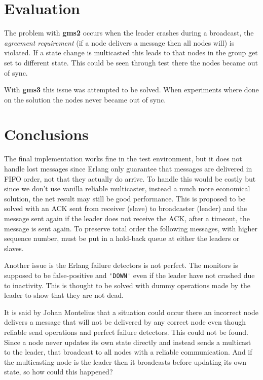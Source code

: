 \documentclass[a4paper, 11pt]{article}
\begin{document}
\section{Evaluation}

The problem with \textbf{gms2} occurs when the leader crashes during a broadcast, the \textit{agreement requirement} (if a node delivers a message then all nodes will) is violated. If a state change is multicasted this leads to that nodes in the group get set to different state. This could be seen through test there the nodes became out of sync.

With \textbf{gms3} this issue was attempted to be solved. When experiments where done on the solution the nodes never became out of sync.

\section{Conclusions}

The final implementation works fine in the test environment, but it does not handle lost messages since Erlang only guarantee that messages are delivered in FIFO order, not that they actually do arrive. To handle this would be costly but since we don't use vanilla reliable multicaster, instead a much more economical solution, the net result may still be good performance. This is proposed to be solved with an ACK sent from receiver (slave) to broadcaster (leader) and the message sent again if the leader does not receive the ACK, after a timeout, the message is sent again. To preserve total order the following messages, with higher sequence number, must be put in a hold-back queue at either the leaders or slaves.

Another issue is the Erlang failure detectors is not perfect. The monitors is supposed to be false-positive and \verb!'DOWN'! even if the leader have not crashed due to inactivity. This is thought to be solved with dummy operations made by the leader to show that they are not dead.

It is said by Johan Montelius that a situation could occur there an incorrect node delivers a message that will not be delivered by any correct node even though reliable send operations and perfect failure detectors. This could not be found. Since a node never updates its own state directly and instead sends a multicast to the leader, that broadcast to all nodes with a reliable communication. And if the multicasting node is the leader then it broadcasts before updating its own state, so how could this happened?
\end{document}

